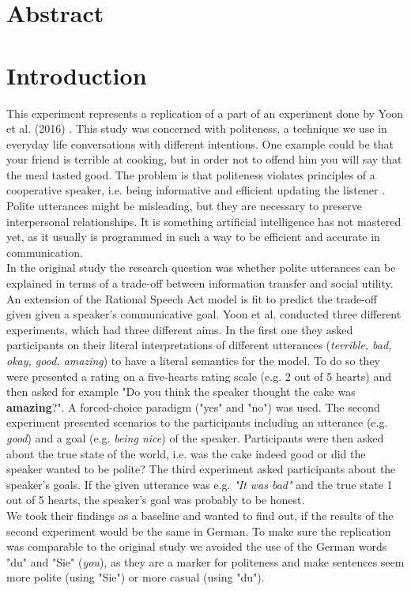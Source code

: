 \documentclass[a4paper,11pt]{article}
\title{}
\author{}
\begin{document}
\maketitle

\section{Abstract}

\section{Introduction}
This experiment represents a replication of a part of an experiment done by Yoon et al. (2016) \cite{yoon2016talking}. This study was concerned with politeness, a technique we use in everyday life conversations with different intentions. One example could be that your friend is terrible at cooking, but in order not to offend him you will say that the meal tasted good. The problem is that politeness violates principles of a cooperative speaker, i.e. being informative and efficient updating the listener \cite{grice1975logic}. Polite utterances might be misleading, but they are necessary to preserve interpersonal relationships. It is something artificial intelligence has not mastered yet, as it usually is programmed in such a way to be efficient and accurate in communication. \\ In the original study the research question was whether polite utterances can be explained in terms of a trade-off between information transfer and social utility. An extension of the Rational Speech Act model is fit to predict the trade-off given given a speaker's communicative goal\cite{frank2012predicting}.  Yoon et al. \cite{yoon2016talking} conducted three different experiments, which had three different aims. In the first one they asked participants on their literal interpretations of different utterances (\textit{terrible, bad, okay, good, amazing}) to have a literal semantics for the model. To do so they were presented a rating on a five-hearts rating scale (e.g. 2 out of 5 hearts) and then asked for example "Do you think the speaker thought the cake was \textbf{amazing}?". A forced-choice paradigm ("yes" and "no") was used. The second experiment presented scenarios to the participants including an utterance (e.g. \textit{good}) and a goal (e.g. \textit{being nice}) of the speaker. Participants were then asked about the true state of the world, i.e. was the cake indeed good or did the speaker wanted to be polite? The third experiment asked participants about the speaker's goals. If the given utterance was e.g. \textit{"It was bad"} and the true state 1 out of 5 hearts, the speaker's goal was probably to be honest. \\ We took their findings as a baseline and wanted to find out, if the results of the second experiment would be the same in German. To make sure the replication was comparable to the original study we avoided the use of the German words "du" and "Sie" (\textit{you}), as they are a marker for politeness and make sentences seem more polite (using "Sie") or more casual (using "du"). 
\end{document}
